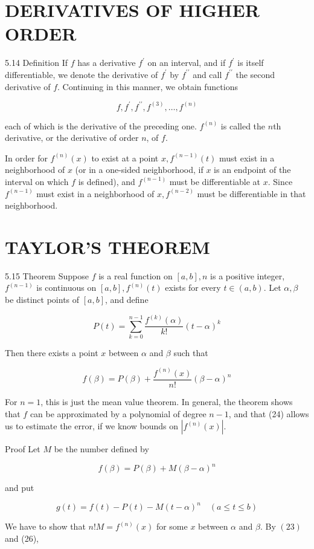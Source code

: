 \documentclass[10pt]{article}
\begin{document}
\section{DERIVATIVES OF HIGHER ORDER}
5.14 Definition If $f$ has a derivative $f^{\prime}$ on an interval, and if $f^{\prime}$ is itself differentiable, we denote the derivative of $f^{\prime}$ by $f^{\prime \prime}$ and call $f^{\prime \prime}$ the second derivative of $f$. Continuing in this manner, we obtain functions

$$
f, f^{\prime}, f^{\prime \prime}, f^{(3)}, \ldots, f^{(n)}
$$

each of which is the derivative of the preceding one. $f^{(n)}$ is called the $n$th derivative, or the derivative of order $n$, of $f$.

In order for $f^{(n)}(x)$ to exist at a point $x, f^{(n-1)}(t)$ must exist in a neighborhood of $x$ (or in a one-sided neighborhood, if $x$ is an endpoint of the interval on which $f$ is defined), and $f^{(n-1)}$ must be differentiable at $x$. Since $f^{(n-1)}$ must exist in a neighborhood of $x, f^{(n-2)}$ must be differentiable in that neighborhood.

\section{TAYLOR'S THEOREM}
5.15 Theorem Suppose $f$ is a real function on $[a, b], n$ is a positive integer, $f^{(n-1)}$ is continuous on $[a, b], f^{(n)}(t)$ exists for every $t \in(a, b)$. Let $\alpha, \beta$ be distinct points of $[a, b]$, and define

$$
P(t)=\sum_{k=0}^{n-1} \frac{f^{(k)}(\alpha)}{k !}(t-\alpha)^{k}
$$

Then there exists a point $x$ between $\alpha$ and $\beta$ such that

$$
f(\beta)=P(\beta)+\frac{f^{(n)}(x)}{n !}(\beta-\alpha)^{n}
$$

For $n=1$, this is just the mean value theorem. In general, the theorem shows that $f$ can be approximated by a polynomial of degree $n-1$, and that (24) allows us to estimate the error, if we know bounds on $\left|f^{(n)}(x)\right|$.

Proof Let $M$ be the number defined by

$$
f(\beta)=P(\beta)+M(\beta-\alpha)^{n}
$$

and put

$$
g(t)=f(t)-P(t)-M(t-\alpha)^{n} \quad(a \leq t \leq b)
$$

We have to show that $n ! M=f^{(n)}(x)$ for some $x$ between $\alpha$ and $\beta$. By $(23)$ and (26),
\end{document}
